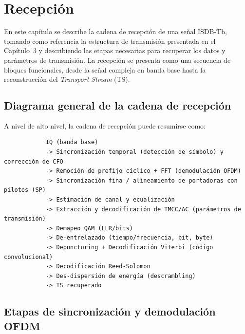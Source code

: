 
\chapter{Recepción}
\label{ch:recepcion_isdbt}

En este capítulo se describe la cadena de recepción de una señal ISDB-Tb,
tomando como referencia la estructura de transmisión presentada en el Capítulo~3
y describiendo las etapas necesarias para recuperar los datos y parámetros de transmisión.
La recepción se presenta como una secuencia de bloques funcionales, desde la señal
compleja en banda base hasta la reconstrucción del \textit{Transport Stream} (TS).

\section{Diagrama general de la cadena de recepción}
\label{sec:rx_diagrama_general}

A nivel de alto nivel, la cadena de recepción puede resumirse como:

\begin{center}
	\begin{minipage}{0.95\textwidth}
		\begin{verbatim}
			IQ (banda base)
			-> Sincronización temporal (detección de símbolo) y corrección de CFO
			-> Remoción de prefijo cíclico + FFT (demodulación OFDM)
			-> Sincronización fina / alineamiento de portadoras con pilotos (SP)
			-> Estimación de canal y ecualización
			-> Extracción y decodificación de TMCC/AC (parámetros de transmisión)
			-> Demapeo QAM (LLR/bits)
			-> De-entrelazado (tiempo/frecuencia, bit, byte)
			-> Depuncturing + Decodificación Viterbi (código convolucional)
			-> Decodificación Reed-Solomon
			-> Des-dispersión de energía (descrambling)
			-> TS recuperado
		\end{verbatim}
	\end{minipage}
\end{center}

\section{Etapas de sincronización y demodulación OFDM}
\label{sec:rx_ofdm_sync}

